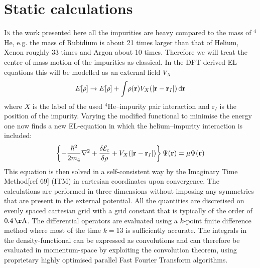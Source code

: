 \documentclass[12pt,a4paper,twosides]{book}
\renewcommand{\vec}[1]{\bm{\mathrm{#1}}}
\newcommand{\unit}[1]{\,\mathrm{#1}}
\newcommand{\diff}[1]{\,\mathrm{d}{\vec{#1}}}
\begin{document}
	\section{Static calculations}
		\lettrine[lines=3,findent=3pt,nindent=0pt]{I}{n} the work presented here all the impurities are heavy compared to the mass of $^4$He, e.g. the mass of Rubidium is about 21 times larger than that of Helium, Xenon roughly 33 times and Argon about 10 times. Therefore we will treat the centre of mass motion of the impurities as classical. In the DFT derived EL-equations this will be modelled as an external field $V_X$
		\begin{align}
			E[\rho] \rightarrow E[\rho] +  \int\!\rho({\mathbf r}) V_X\qty(\abs{{\mathbf r} - {\mathbf r}_I})\diff{r} \label{eq:el-static-hi}
		\end{align}
		where $X$ is the label of the used $^4$He--impurity pair interaction and ${\vec r}_I$ is the position of the impurity. Varying the modified functional to minimise the energy one now finds a new EL-equation in which the helium--impurity interaction is included:
		\begin{align}
			\left\{-\frac{\hbar^2}{2m_4} \laplacian + \fdv{\mathcal{E}_c}{\rho} + V_X(|{\mathbf r} - {\mathbf r_I}|)\right\}\Psi({\mathbf r}) = \mu \Psi({\mathbf r}) \label{eq:el-static-hi}
		\end{align}
		This equation is then solved in a self-consistent way by the Imaginary Time Method[ref 69] (ITM) in cartesian coordinates upon convergence. The calculations are performed in three dimensions without imposing any symmetries that are present in the external potential. All the quantities are discretised on evenly spaced cartesian grid with a grid constant that is typically of the order of $0.4\unit{\AA}$. The differential operators are evaluated using a $k$-point finite difference method where most of the time $k=13$ is sufficiently accurate. The integrals in the density-functional can be expressed as convolutions and can therefore be evaluated in momentum-space by exploiting the convolution theorem, using proprietary highly optimised parallel Fast Fourier Transform algorithms. 
			
\end{document}
